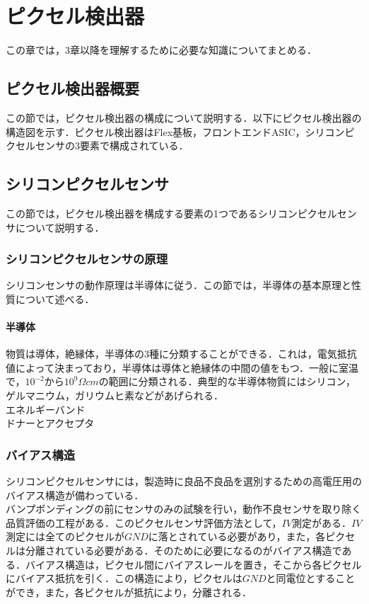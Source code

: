 \chapter{ピクセル検出器}
この章では，3章以降を理解するために必要な知識についてまとめる．

\section{ピクセル検出器概要}
この節では，ピクセル検出器の構成について説明する．以下にピクセル検出器の構造図を示す．ピクセル検出器はFlex基板，フロントエンドASIC，シリコンピクセルセンサの3要素で構成されている．

\section{シリコンピクセルセンサ}
この節では，ピクセル検出器を構成する要素の1つであるシリコンピクセルセンサについて説明する．
\subsection{シリコンピクセルセンサの原理}
シリコンセンサの動作原理は半導体に従う．この節では，半導体の基本原理と性質について述べる．
\subsubsection{半導体}
物質は導体，絶縁体，半導体の3種に分類することができる．これは，電気抵抗値によって決まっており，半導体は導体と絶縁体の中間の値をもつ．一般に室温で，$10^{-2}$から$10^9 \Omega cm$の範囲に分類される．典型的な半導体物質にはシリコン，ゲルマニウム，ガリウムヒ素などがあげられる．\\
エネルギーバンド\\
ドナーとアクセプタ

\subsection{バイアス構造}
シリコンピクセルセンサには，製造時に良品不良品を選別するための高電圧用のバイアス構造が備わっている．\\
バンプボンディングの前にセンサのみの試験を行い，動作不良センサを取り除く品質評価の工程がある．このピクセルセンサ評価方法として，$IV$測定がある．$IV$測定には全てのピクセルが$GND$に落とされている必要があり，また，各ピクセルは分離されている必要がある．そのために必要になるのがバイアス構造である．バイアス構造は，ピクセル間にバイアスレールを置き，そこから各ピクセルにバイアス抵抗を引く．この構造により，ピクセルは$GND$と同電位とすることができ，また，各ピクセルが抵抗により，分離される．

